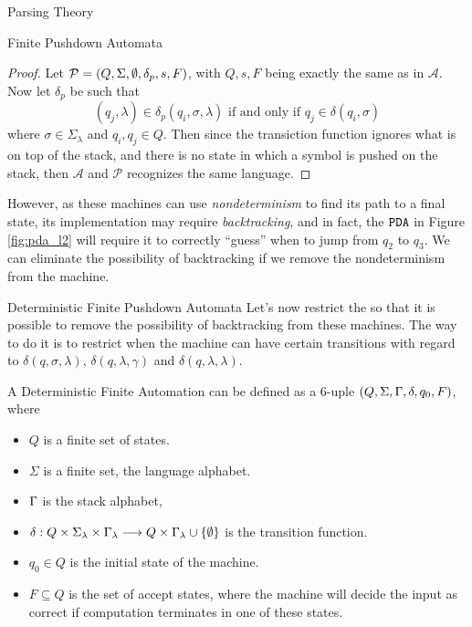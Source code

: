 \begin{section}{Parsing Theory}
\begin{subsection}{Finite Pushdown Automata}
\begin{proof}
Let $\mathcal{P} = (Q, \Sigma, \emptyset, \delta_p, s, F)$, with $Q, s, F$ being
exactly the same as in $\mathcal{A}$. Now let $\delta_p$ be such that
$$(q_j, \lambda) \in \delta_p(q_i, \sigma, \lambda) \text{ if and only if } q_j \in \delta(q_i, \sigma)$$
where $\sigma \in \Sigma_\lambda$ and $q_i, q_j \in Q$. Then since the transiction function
ignores what is on top of the stack, and there is no state in which a symbol is
pushed on the stack, then $\mathcal{A}$ and $\mathcal{P}$ recognizes the same
language.
\end{proof}

However, as these machines can use \textit{nondeterminism} to find its path
to a final state, its implementation may require \textit{backtracking},
and in fact, the $\texttt{PDA}$ in Figure \ref{fig:pda_l2} will require it to correctly
``guess'' when to jump from $q_2$ to $q_3$. We can eliminate the possibility
of backtracking if we remove the nondeterminism from the machine.

\end{subsection}

\begin{subsection}{Deterministic Finite Pushdown Automata}
	Let's now restrict the  so that
it is possible to remove the possibility of backtracking from these machines.
The way to do it is to restrict when the machine can have certain transitions
with regard to $\delta(q, \sigma, \lambda)$, $\delta(q, \lambda, \gamma)$ and
$\delta(q, \lambda, \lambda)$.

\begin{definition}
A Deterministic Finite Automation  can be defined as a 6-uple
$(Q, \Sigma, \Gamma, \delta, q_0, F)$, where
\begin{itemize}

\item $Q$ is a finite set of states.
\item $\Sigma$ is a finite set, the language alphabet.
\item $\Gamma$ is the stack alphabet,
\item $\delta:Q\times\Sigma_\lambda \times \Gamma_\lambda \longrightarrow Q \times \Gamma_\lambda \cup \{\emptyset \}$ is the transition function.
\item $q_0 \in Q$ is the initial state of the machine.
\item $F \subseteq Q$ is the set of accept states, where the machine will
decide the input as correct if computation terminates in one of these
states.
\end{itemize}


\end{definition}
\end{subsection}
\end{section}
